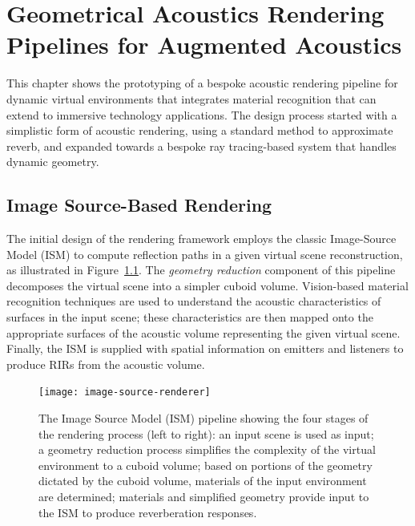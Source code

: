 \chapter{Geometrical Acoustics Rendering Pipelines for Augmented Acoustics}\label{ch:acousticrendering} %

This chapter shows the prototyping of a bespoke acoustic rendering pipeline for dynamic virtual environments that integrates material recognition that can extend to immersive technology applications. The design process started with a simplistic form of acoustic rendering, using a standard method to approximate reverb, and expanded towards a bespoke ray tracing-based system that handles dynamic geometry.

\section{Image Source-Based Rendering}
The initial design of the rendering framework employs the classic Image-Source Model (ISM) \citep{savioja1999creating, allen1979image} to compute reflection paths in a given virtual scene reconstruction, as illustrated in Figure~\ref{fig:image-source-pipeline}. The \emph{geometry reduction} component of this pipeline decomposes the virtual scene into a simpler cuboid volume. Vision-based material recognition techniques are used to understand the acoustic characteristics of surfaces in the input scene; these characteristics are then mapped onto the appropriate surfaces of the acoustic volume representing the given virtual scene. Finally, the ISM is supplied with spatial information on emitters and listeners to produce RIRs from the acoustic volume.\par

\begin{figure}[htb]
    \centering
    \texttt{[image: image-source-renderer]}
    \caption{The Image Source Model (ISM) pipeline showing the four stages of the rendering process (left to right): an input scene is used as input; a geometry reduction process simplifies the complexity of the virtual environment to a cuboid volume; based on portions of the geometry dictated by the cuboid volume, materials of the input environment are determined; materials and simplified geometry provide input to the ISM to produce reverberation responses.}
\label{fig:image-source-pipeline}
\end{figure}

